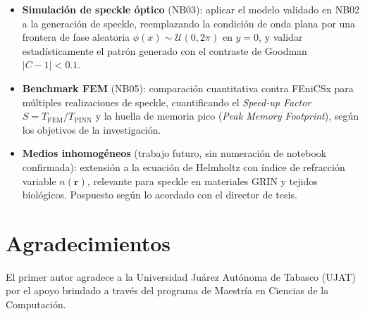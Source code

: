 \begin{itemize}
  \item \textbf{Simulación de speckle óptico} (NB03): aplicar el modelo validado en NB02
    a la generación de speckle, reemplazando la condición de onda plana por una frontera
    de fase aleatoria $\phi(x) \sim \mathcal{U}(0, 2\pi)$ en $y = 0$, y validar
    estadísticamente el patrón generado con el contraste de Goodman $|C - 1| < 0.1$.

  \item \textbf{Benchmark FEM} (NB05): comparación cuantitativa contra FEniCSx para
    múltiples realizaciones de speckle, cuantificando el \textit{Speed-up Factor}
    $S = T_{\mathrm{FEM}} / T_{\mathrm{PINN}}$ \cite{Thuerey2021_PBDL} y la
    huella de memoria pico (\textit{Peak Memory Footprint}), según los objetivos
    de la investigación.

  \item \textbf{Medios inhomogéneos} (trabajo futuro, sin numeración de notebook
    confirmada): extensión a la ecuación de Helmholtz con índice de refracción
    variable $n(\mathbf{r})$, relevante para speckle en materiales GRIN y tejidos
    biológicos. Pospuesto según lo acordado con el director de tesis.
\end{itemize}

\section*{Agradecimientos}

El primer autor agradece a la Universidad Juárez Autónoma de Tabasco (UJAT) por el
apoyo brindado a través del programa de Maestría en Ciencias de la Computación.
